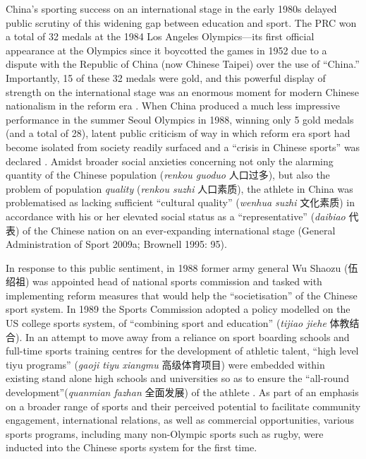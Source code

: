 \begin{CJK}{UTF8}{gbsn}

China's sporting success on an international stage in the early 1980s delayed public scrutiny of this widening gap between education and sport. The PRC won a total of 32 medals at the 1984 Los Angeles Olympics---its first official appearance at the Olympics since it boycotted the games in 1952 due to a dispute with the Republic of China (now Chinese Taipei) over the use of ``China.''  Importantly, 15 of these 32 medals were gold, and this powerful display of strength on the international stage was an enormous moment for modern Chinese nationalism in the reform era \citep{Brownell2008}.  When China produced a much less impressive performance in the summer Seoul Olympics in 1988, winning only 5 gold medals (and a total of 28), latent public criticism of way in which reform era sport had become isolated from society readily surfaced and a ``crisis in Chinese sports'' was declared \citep[199]{Brownell1995}.  Amidst broader social anxieties concerning not only the alarming quantity of the Chinese population (\textit{renkou guoduo} 人口过多), but also the problem of population \textit{quality} (\textit{renkou suzhi} 人口素质), the athlete in China was problematised as lacking sufficient ``cultural quality'' (\textit{wenhua suzhi} 文化素质) in accordance with his or her elevated social status as a ``representative'' (\textit{daibiao} 代表) of the Chinese nation on an ever-expanding international stage (General Administration of Sport 2009a; Brownell 1995: 95).

In response to this public sentiment, in 1988 former army general Wu Shaozu (伍绍祖) was appointed head of national sports commission and tasked with implementing reform measures that would help the ``societisation'' of the Chinese sport system.  In 1989 the Sports Commission adopted a policy modelled on the US college sports system, of ``combining sport and education'' (\textit{tijiao jiehe} 体教结合).  In an attempt to move away from a reliance on sport boarding schools and full-time sports training centres for the development of athletic talent, ``high level tiyu programs'' (\textit{gaoji tiyu xiangmu} 高级体育项目) were embedded within existing stand alone high schools and universities so as to ensure the ``all-round development''(\textit{quanmian fazhan} 全面发展) of the athlete \citep[203]{Brownell1995}.  As part of an emphasis on a broader range of sports and their perceived potential to facilitate community engagement, international relations, as well as commercial opportunities, various sports programs, including many non-Olympic sports such as rugby, were inducted into the Chinese sports system for the first time\citep[70]{Knuttgen1990}.


\end{CJK}
